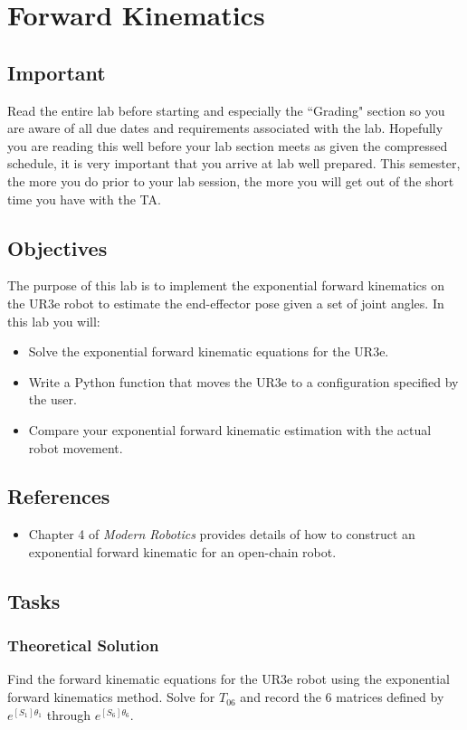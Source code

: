 \chapter{Forward Kinematics}
\section{Important}
Read the entire lab before starting and especially the ``Grading" section so you are aware of all due dates and requirements associated with the lab.  Hopefully you are reading this well before your lab section meets as given the compressed schedule, it is very important that you arrive at lab well prepared.  This semester, the more you do prior to your lab session, the more you will get out of the short time you have with the TA.
\section{Objectives}
The purpose of this lab is to implement the exponential forward kinematics on the UR3e robot to estimate the end-effector pose given a set of joint angles.  In this lab you will:
\begin{itemize}
	\item Solve the exponential forward kinematic equations for the UR3e.
	\item Write a Python function that moves the UR3e to a configuration specified by the user.
	\item Compare your exponential forward kinematic estimation with the actual robot movement. 
\end{itemize}

\section{References}
\begin{itemize}
\item Chapter 4 of \textit{Modern Robotics} provides details of how to construct an exponential forward kinematic for an open-chain robot.
\end{itemize}

\section{Tasks}

\subsection{Theoretical Solution}
Find the forward kinematic equations for the UR3e robot using the exponential forward kinematics method.  Solve for $T_{06}$ and record the 6 matrices defined by $e^{[S_1]\theta_1}$ through $e^{[S_6]\theta_6}$.

